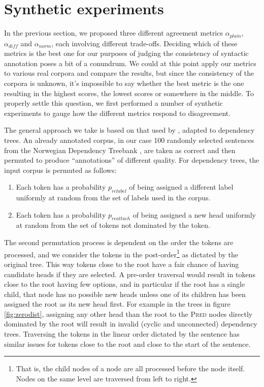 \documentclass[11pt]{article}
\let\citeN=\newcite
\begin{document}
\section{Synthetic experiments}
In the previous section, we proposed three different agreement metrics
$\alpha_{plain}$, $\alpha_{diff}$ and $\alpha_{norm}$, each involving
different trade-offs. Deciding which of these metrics is the best one for our
purposes of judging the consistency of syntactic annotation poses a bit of a
conundrum. We could at this point apply our metrics to various real corpora
and compare the results, but since the consistency of the corpora is unknown,
it's impossible to say whether the best metric is the one resulting in the
highest scores, the lowest scores or somewhere in the middle. To properly
settle this question, we first performed a number of synthetic experiments to
gauge how the different metrics respond to disagreement.

The general approach we take is based on that used by \citeN{Mathet:etal12},
adapted to dependency trees. An already annotated corpus, in our case 100
randomly selected sentences from the Norwegian Dependency Treebank
\cite{Solberg:etal14}, are taken as correct and then permuted to produce
``annotations'' of different quality. For dependency trees, the input corpus
is permuted as follows:
\begin{enumerate}
    \item Each token has a probability $p_{relabel}$ of being assigned a
        different label uniformly at random from the set of labels used in the
        corpus.
    \item Each token has a probability $p_{reattach}$ of being assigned a new
        head uniformly at random from the set of tokens not dominated by the
        token.
\end{enumerate}
The second permutation process is dependent on the order the tokens are
processed, and we consider the tokens in the post-order\footnote{That is, the
child nodes of a node are all processed before the node itself. Nodes on the
same level are traversed from left to right.} as dictated by the original
tree. This way tokens close to the root have a fair chance of having candidate
heads if they are selected. A pre-order traversal would result in tokens close
to the root having few options, and in particular if the root has a single
child, that node has no possible new heads unless one of its children has been
assigned the root as its new head first. For example in the trees in figure
\ref{fig:zerodist}, assigning any other head than the root to the
\textsc{Pred} nodes directly dominated by the root will result in invalid
(cyclic and unconnected) dependency trees. Traversing the tokens in the linear
order dictated by the sentence has similar issues for tokens close to the root
and close to the start of the sentence.
\end{document}
